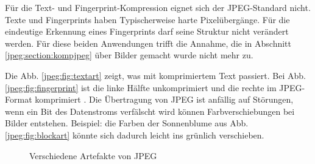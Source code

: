 Für die Text- und Fingerprint-Kompression eignet sich der JPEG-Standard nicht.
Texte und Fingerprints haben Typischerweise harte Pixelübergänge.
Für die eindeutige Erkennung eines Fingerprints darf seine Struktur nicht verändert werden.
Für diese beiden Anwendungen trifft die Annahme, die in Abschnitt \ref{jpeg:section:kompjpeg} über Bilder gemacht wurde nicht mehr zu.

Die Abb. \ref{jpeg:fig:textart} zeigt, was mit komprimiertem Text passiert.
Bei Abb. \ref{jpeg:fig:fingerprint} ist die linke Hälfte unkomprimiert und die rechte im JPEG-Format komprimiert .
Die Übertragung von JPEG ist anfällig auf Störungen, wenn ein Bit des Datenstroms verfälscht wird können Farbverschiebungen bei Bilder entstehen.
Beispiel: die Farben der Sonnenblume aus Abb. \ref{jpeg:fig:blockart} könnte sich dadurch leicht ins grünlich verschieben.


\begin{figure}[h]
    \centering
    \hfill
    \hfill
    \caption{Verschiedene Artefakte von JPEG 
    \label{jpeg:fig:bspproblem}}
\end{figure}
